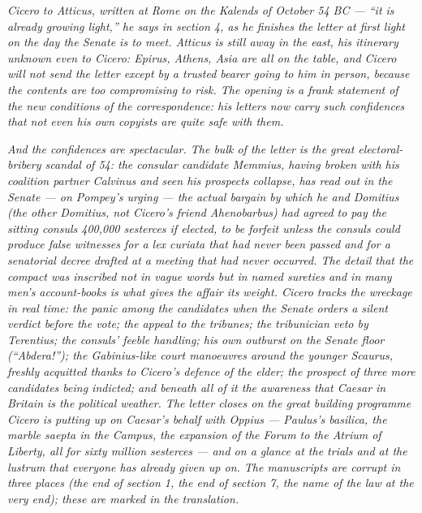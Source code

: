 
\textit{Cicero to Atticus, written at Rome on the Kalends of October
54 BC --- ``it is already growing light,'' he says in section 4, as he
finishes the letter at first light on the day the Senate is to
meet. Atticus is still away in the east, his itinerary unknown
even to Cicero: Epirus, Athens, Asia are all on the table, and
Cicero will not send the letter except by a trusted bearer going
to him in person, because the contents are too compromising to
risk. The opening is a frank statement of the new conditions of
the correspondence: his letters now carry such confidences that
not even his own copyists are quite safe with them.}

\textit{And the confidences are spectacular. The bulk of the letter
is the great electoral-bribery scandal of 54: the consular
candidate Memmius, having broken with his coalition partner
Calvinus and seen his prospects collapse, has read out in the
Senate --- on Pompey's urging --- the actual bargain by which he and
Domitius (the other Domitius, not Cicero's friend Ahenobarbus) had
agreed to pay the sitting consuls 400,000 sesterces if elected, to
be forfeit unless the consuls could produce false witnesses for a
\textit{lex curiata} that had never been passed and for a senatorial
decree drafted at a meeting that had never occurred. The detail
that the compact was inscribed not in vague words but in named
sureties and in many men's account-books is what gives the affair
its weight. Cicero tracks the wreckage in real time: the panic
among the candidates when the Senate orders a silent verdict before
the vote; the appeal to the tribunes; the tribunician veto by
Terentius; the consuls' feeble handling; his own outburst on the
Senate floor (``Abdera!''); the Gabinius-like court manoeuvres
around the younger Scaurus, freshly acquitted thanks to Cicero's
defence of the elder; the prospect of three more candidates being
indicted; and beneath all of it the awareness that Caesar in
Britain is the political weather. The letter closes on the great
building programme Cicero is putting up on Caesar's behalf with
Oppius --- Paulus's basilica, the marble \textit{saepta} in the
Campus, the expansion of the Forum to the Atrium of Liberty, all
for sixty million sesterces --- and on a glance at the trials and at
the \textit{lustrum} that everyone has already given up on. The
manuscripts are corrupt in three places (the end of section 1, the
end of section 7, the name of the law at the very end); these are
marked in the translation.}
